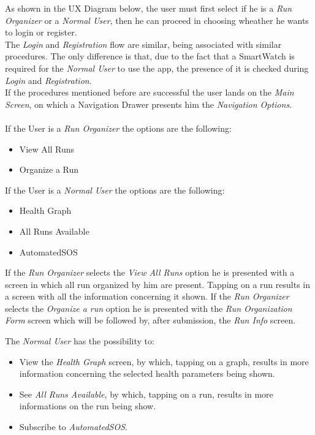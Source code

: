 As shown in the UX Diagram below, the user must first select if he is a \textit{Run Organizer} or a \textit{Normal User}, then he can proceed in choosing wheather he wants to login or register. \\
The \textit{Login} and \textit{Registration} flow are similar, being associated with similar procedures.
The only difference is that, due to the fact that a SmartWatch is required for the \textit{Normal User} to use the app, the presence of it is checked during \textit{Login} and \textit{Registration}.
\\
If the procedures mentioned before are successful the user lands on the \textit{Main Screen}, on which a Navigation Drawer presents him the \textit{Navigation Options}.\\ \\
\noindent If the User is a \textit{Run Organizer} the options are the following: 
\begin{itemize}
    \item View All Runs
    \item Organize a Run
\end{itemize}
\vspace{0.5cm}
If the User is a \textit{Normal User} the options are the following: 
\begin{itemize}
    \item Health Graph
    \item All Runs Available
    \item AutomatedSOS
\end{itemize}

\vspace{0.5cm}
\noindent If the \textit{Run Organizer} selects the \textit{View All Runs} option he is presented with a screen in which all run organized by him are present. Tapping on a run results in a screen with all the information concerning it shown.
If the \textit{Run Organizer} selects the \textit{Organize a run} option he is presented with the \textit{Run Organization Form} screen which will be followed by, after submission, the \textit{Run Info} screen.

\vspace{0.5cm}
\noindent The \textit{Normal User} has the possibility to: 
\begin{itemize}
    \item View the \textit{Health Graph} screen, by which, tapping on a graph, results in more information concerning the selected health parameters being shown.
    \item See \textit{All Runs Available}, by which, tapping on a run, results in more informations on the run being show.
    \item Subscribe to \textit{AutomatedSOS}.
\end{itemize}

